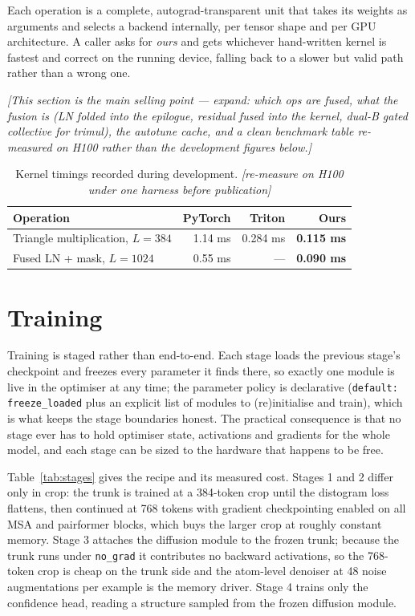 \documentclass[11pt]{article}
\newcommand{\todo}[1]{{\color{draft}\itshape\small[#1]}}
\begin{document}
Each operation is a complete, autograd-transparent unit that takes its weights
as arguments and selects a backend internally, per tensor shape and per GPU
architecture. A caller asks for \emph{ours} and gets whichever hand-written
kernel is fastest and correct on the running device, falling back to a slower
but valid path rather than a wrong one.

\todo{This section is the main selling point --- expand: which ops are fused,
what the fusion is (LN folded into the epilogue, residual fused into the
kernel, dual-B gated collective for trimul), the autotune cache, and a clean
benchmark table re-measured on H100 rather than the development figures below.}

\begin{table}[t]
\centering\small\sffamily
\caption{\normalfont\rmfamily Kernel timings recorded during development.
\todo{re-measure on H100 under one harness before publication}}
\label{tab:kernels}
\begin{tabularx}{\linewidth}{@{}Xrrr@{}}
\toprule
\rmfamily Operation & \rmfamily PyTorch & \rmfamily Triton & \rmfamily Ours \\
\midrule
Triangle multiplication, $L{=}384$ & 1.14 ms & 0.284 ms & \textbf{0.115 ms} \\
Fused LN + mask, $L{=}1024$        & 0.55 ms & ---      & \textbf{0.090 ms} \\
\bottomrule
\end{tabularx}
\end{table}

\section{Training}
\label{sec:training}
Training is staged rather than end-to-end. Each stage loads the previous
stage's checkpoint and freezes every parameter it finds there, so exactly one
module is live in the optimiser at any time; the parameter policy is
declarative (\texttt{default: freeze\_loaded} plus an explicit list of modules
to (re)initialise and train), which is what keeps the stage boundaries honest.
The practical consequence is that no stage ever has to hold optimiser state,
activations and gradients for the whole model, and each stage can be sized to
the hardware that happens to be free.

Table~\ref{tab:stages} gives the recipe and its measured cost. Stages 1 and 2
differ only in crop: the trunk is trained at a 384-token crop until the
distogram loss flattens, then continued at 768 tokens with gradient
checkpointing enabled on all MSA and pairformer blocks, which buys the larger
crop at roughly constant memory. Stage 3 attaches the diffusion module to the
frozen trunk; because the trunk runs under \texttt{no\_grad} it contributes no
backward activations, so the 768-token crop is cheap on the trunk side and the
atom-level denoiser at 48 noise augmentations per example is the memory driver.
Stage 4 trains only the confidence head, reading a structure sampled from the
frozen diffusion module.
\end{document}
